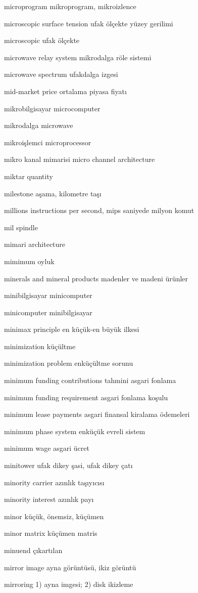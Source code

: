 \documentclass[12pt,fleqn]{article}\usepackage{../../common}
\begin{document}
microprogram mikroprogram, mikroizlence

microscopic surface tension ufak ölçekte yüzey gerilimi

microscopic ufak ölçekte

microwave relay system mikrodalga röle sistemi

microwave spectrum ufakdalga izgesi

mid-market price ortalama piyasa fiyatı

mikrobilgisayar microcomputer

mikrodalga microwave

mikroişlemci microprocessor

mikro kanal mimarisi micro channel architecture

miktar quantity

milestone aşama, kilometre taşı

millions instructions per second, mips saniyede milyon komut

mil spindle

mimari architecture

mimimum oyluk

minerals and mineral products madenler ve madeni ürünler

minibilgisayar minicomputer

minicomputer minibilgisayar

minimax principle en küçük-en büyük ilkesi

minimization küçültme

minimization problem enküçültme sorunu

minimum funding contributions tahmini asgari fonlama

minimum funding requirement asgari fonlama koşulu

minimum lease payments asgari finansal kiralama ödemeleri

minimum phase system enküçük evreli sistem

minimum wage asgari ücret

minitower ufak dikey şasi, ufak dikey çatı

minority carrier azınlık taşıyıcısı

minority interest azınlık payı

minor küçük, önemsiz, küçümen

minor matrix küçümen matris

minuend çıkartılan

mirror image ayna görüntüsü, ikiz görüntü

mirroring 1) ayna imgesi; 2) disk ikizleme
\end{document}
